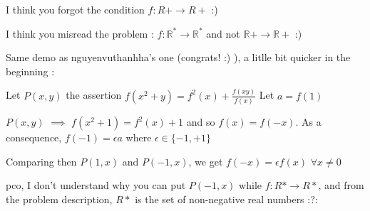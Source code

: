 \begin{solution}
	\begin{tcolorbox} I think you forgot the condition $ f : R + \rightarrow R +$  :)\end{tcolorbox}

I think you misread the problem : $ f : \mathbb R^*\to\mathbb R^*$ and not $ \mathbb R + \to\mathbb R +$ :)
\end{solution}



\begin{solution}
	\begin{tcolorbox}Same demo as nguyenvuthanhha's one (congrats!  :) ), a litlle bit quicker in the beginning :

Let $ P(x,y)$ the assertion $ f(x^2 + y) = f^2(x) + \frac {f(xy)}{f(x)}$
Let $ a = f(1)$

$ P(x,y)$ $ \implies$ $ f(x^2 + 1) = f^2(x) + 1$ and so $ f(x) = f( - x)$. As a consequence, $ f( - 1) = \epsilon a$ where $ \epsilon\in\{ - 1, + 1\}$

Comparing then $ P(1,x)$ and $ P( - 1,x)$, we get $ f( - x) = \epsilon f(x)$ $ \forall x\neq 0$
\end{tcolorbox}

pco, I don't understand why you can put $ P(-1,x)$ while $ f: R* \rightarrow R*$, and from the problem description, $ R*$ is the set of non-negative real numbers  :?:
\end{solution}






